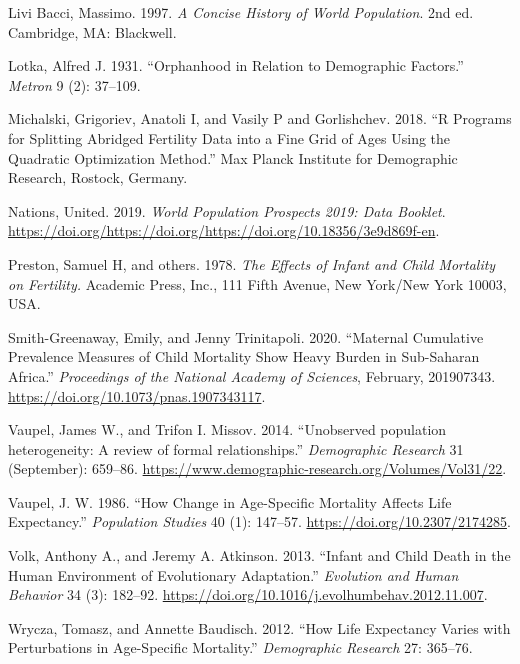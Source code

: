 \documentclass[
]{article}
\newlength{\cslhangindent}
\newenvironment{cslreferences}%
  {\setlength{\parindent}{0pt}%
  \everypar{\setlength{\hangindent}{\cslhangindent}}\ignorespaces}%
  {\par}
\begin{document}
\begin{cslreferences}
\leavevmode\hypertarget{ref-livi_bacci_concise_1997}{}%
Livi Bacci, Massimo. 1997. \emph{A Concise History of World Population}.
2nd ed. Cambridge, MA: Blackwell.

\leavevmode\hypertarget{ref-lotka1931orphanhood}{}%
Lotka, Alfred J. 1931. ``Orphanhood in Relation to Demographic
Factors.'' \emph{Metron} 9 (2): 37--109.

\leavevmode\hypertarget{ref-Michalski2018}{}%
Michalski, Grigoriev, Anatoli I, and Vasily P and Gorlishchev. 2018. ``R
Programs for Splitting Abridged Fertility Data into a Fine Grid of Ages
Using the Quadratic Optimization Method.'' Max Planck Institute for
Demographic Research, Rostock, Germany.

\leavevmode\hypertarget{ref-WPP19}{}%
Nations, United. 2019. \emph{World Population Prospects 2019: Data
Booklet}.
\url{https://doi.org/https://doi.org/https://doi.org/10.18356/3e9d869f-en}.

\leavevmode\hypertarget{ref-preston1978effects}{}%
Preston, Samuel H, and others. 1978. \emph{The Effects of Infant and
Child Mortality on Fertility.} Academic Press, Inc., 111 Fifth Avenue,
New York/New York 10003, USA.

\leavevmode\hypertarget{ref-smith-greenaway_maternal_2020}{}%
Smith-Greenaway, Emily, and Jenny Trinitapoli. 2020. ``Maternal
Cumulative Prevalence Measures of Child Mortality Show Heavy Burden in
Sub-Saharan Africa.'' \emph{Proceedings of the National Academy of
Sciences}, February, 201907343.
\url{https://doi.org/10.1073/pnas.1907343117}.

\leavevmode\hypertarget{ref-Vaupel2014}{}%
Vaupel, James W., and Trifon I. Missov. 2014. ``Unobserved population
heterogeneity: A review of formal relationships.'' \emph{Demographic
Research} 31 (September): 659--86.
\url{https://www.demographic-research.org/Volumes/Vol31/22}.

\leavevmode\hypertarget{ref-Vaupel1986}{}%
Vaupel, J. W. 1986. ``How Change in Age-Specific Mortality Affects Life
Expectancy.'' \emph{Population Studies} 40 (1): 147--57.
\url{https://doi.org/10.2307/2174285}.

\leavevmode\hypertarget{ref-volk_infant_2013}{}%
Volk, Anthony A., and Jeremy A. Atkinson. 2013. ``Infant and Child Death
in the Human Environment of Evolutionary Adaptation.'' \emph{Evolution
and Human Behavior} 34 (3): 182--92.
\url{https://doi.org/10.1016/j.evolhumbehav.2012.11.007}.

\leavevmode\hypertarget{ref-wrycza2012}{}%
Wrycza, Tomasz, and Annette Baudisch. 2012. ``How Life Expectancy Varies
with Perturbations in Age-Specific Mortality.'' \emph{Demographic
Research} 27: 365--76.
\end{cslreferences}
\end{document}
